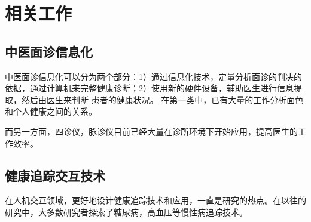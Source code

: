 \chapter{相关工作}

\section{中医面诊信息化}
中医面诊信息化可以分为两个部分：1）通过信息化技术，定量分析面诊的判决的依据，通过计算机来完整健康诊断；2）使用新的硬件设备，辅助医生进行信息提取，然后由医生来判断
患者的健康状况。
在第一类中，已有大量的工作分析面色和个人健康之间的关系。

而另一方面，四诊仪，脉诊仪目前已经大量在诊所环境下开始应用，提高医生的工作效率。

\section{健康追踪交互技术}

在人机交互领域，更好地设计健康追踪技术和应用，一直是研究的热点。在以往的研究中，大多数研究者探索了糖尿病，高血压等慢性病追踪技术。

